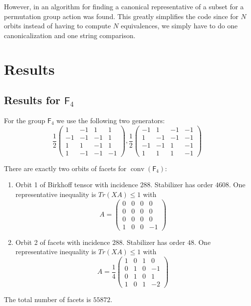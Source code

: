 \documentclass[12pt]{amsart}
\DeclareMathOperator{\conv}{conv}
\begin{document}
However, in \cite{MinimalCanonicalImage} an algorithm for finding a canonical
representative of a subset for a permutation group action was found. This greatly
simplifies the code since for $N$ orbits instead of having to compute $N$ equivalences,
we simply have to do one canonicalization and one string comparison.




\section{Results}\label{SEC_results}

\subsection{Results for $\mathsf{F}_4$}
For the group $\mathsf{F}_4$ we use the following two generators:
\begin{equation*}
\frac{1}{2}\left(\begin{array}{cccc}
1 & -1 & 1 & 1\\
-1 & -1 & -1 & 1\\
1 & 1 & -1 & 1\\
1 & -1 & -1 & -1
\end{array}\right)
,
\frac{1}{2}\left(\begin{array}{cccc}
-1 & 1 & -1 & -1\\
1 & -1 & -1 & -1\\
-1 & -1 & 1 & -1\\
1 & 1 & 1 & -1
\end{array}\right)
\end{equation*}


There are exactly two orbits of facets for $\conv(\mathsf{F}_4)$:
\begin{enumerate}
\item Orbit 1 of Birkhoff tensor with incidence $288$. Stabilizer has order $4608$. One representative inequality is $Tr(XA) \leq 1$ with
\begin{equation*}
A = \left(\begin{array}{cccc}
0 & 0 & 0 & 0\\
0 & 0 & 0 & 0\\
0 & 0 & 0 & 0\\
1 & 0 & 0 & -1
\end{array}\right)
\end{equation*}
\item Orbit 2 of facets with incidence $288$. Stabilizer has order $48$. One representative inequality is $Tr(XA) \leq 1$ with
\begin{equation*}
A = \frac{1}{4}\left(\begin{array}{cccc}
1 & 0 & 1 & 0\\
0 & 1 & 0 & -1\\
0 & 1 & 0 & 1\\
1 & 0 & 1 & -2
\end{array}\right)
\end{equation*}
\end{enumerate}
The total number of facets is $55872$.
\end{document}
